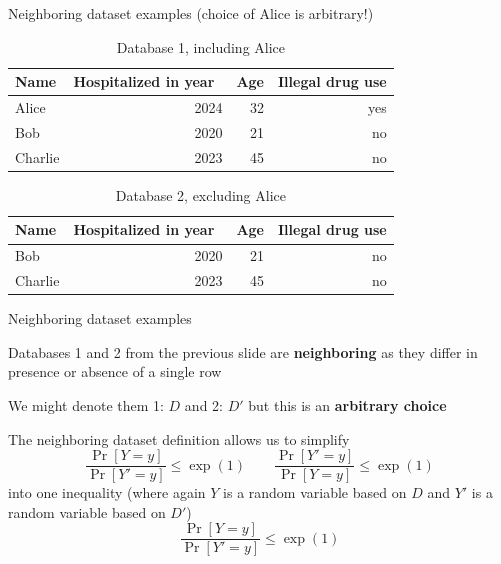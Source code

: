 \documentclass[12pt,aspectratio=169,handout]{beamer}
\begin{document}
\begin{frame}{Neighboring dataset examples (choice of Alice is arbitrary!)}


\begin{table}
	\footnotesize
	\begin{tabular}{lrrr} \toprule
		Name & Hospitalized in year & Age & Illegal drug use \\ \midrule
		Alice & 2024 & 32 & yes \\
		Bob & 2020 & 21 & no \\
		Charlie & 2023 & 45 & no \\ \bottomrule
	\end{tabular}
	\caption{Database 1, including Alice}
\end{table}

\begin{table}
	\footnotesize
	\begin{tabular}{lrrr} \toprule
		Name & Hospitalized in year & Age & Illegal drug use \\ \midrule
		Bob & 2020 & 21 & no \\
		Charlie & 2023 & 45 & no \\ \bottomrule
	\end{tabular}
	\caption{Database 2, excluding Alice}
\end{table}
	
\end{frame}

\begin{frame}{Neighboring dataset examples}

Databases 1 and 2 from the previous slide are \textbf{neighboring} as they differ in presence or absence of a single row

We might denote them 1: $D$ and 2: $D'$ but this is an \textbf{arbitrary choice}

The neighboring dataset definition allows us to simplify
$$
\frac{\Pr[Y = y]}{\Pr[Y' = y]} \leq \exp(1) \qquad
\frac{\Pr[Y' = y]}{\Pr[Y = y]} \leq \exp(1)
$$
into one inequality (where again $Y$ is a random variable based on $D$ and $Y'$ is a random variable based on $D'$)
$$
\frac{\Pr[Y = y]}{\Pr[Y' = y]} \leq \exp(1)
$$

\end{frame}
\end{document}
